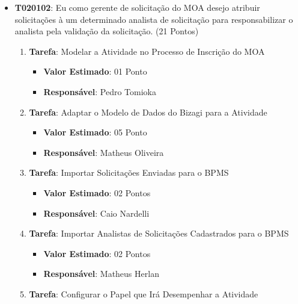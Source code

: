 \begin{itemize}
{\begin{itemize}
{\begin{enumerate}
{\begin{itemize}
					\end{itemize}}
				\item{\textbf{Tarefa}: Configurar o Papel que Irá Desempenhar a Atividade
					\begin{itemize}
						\item{\textbf{Valor Estimado}: 04 Pontos}
						\item{\textbf{Responsável}: Caio Nardelli}
					\end{itemize}}
			\end{enumerate}}
			\item{\textbf{T020102}: Eu como gerente de solicitação do MOA desejo atribuir solicitações à um determinado analista de solicitação para responsabilizar o analista pela validação da solicitação. (21 Pontos)
			\begin{enumerate}
				\item{\textbf{Tarefa}: Modelar a Atividade no Processo de Inscrição do MOA
					\begin{itemize}
						\item{\textbf{Valor Estimado}: 01 Ponto}
						\item{\textbf{Responsável}: Pedro Tomioka}
					\end{itemize}}
				\item{\textbf{Tarefa}: Adaptar o Modelo de Dados do Bizagi para a Atividade
					\begin{itemize}
						\item{\textbf{Valor Estimado}: 05 Ponto}
						\item{\textbf{Responsável}: Matheus Oliveira}
					\end{itemize}}
				\item{\textbf{Tarefa}: Importar Solicitações Enviadas para o BPMS
					\begin{itemize}
						\item{\textbf{Valor Estimado}: 02 Pontos}
						\item{\textbf{Responsável}: Caio Nardelli}
					\end{itemize}}
				\item{\textbf{Tarefa}: Importar Analistas de Solicitações Cadastrados para o BPMS
					\begin{itemize}
						\item{\textbf{Valor Estimado}: 02 Pontos}
						\item{\textbf{Responsável}: Matheus Herlan}
					\end{itemize}}
				\item{\textbf{Tarefa}: Configurar o Papel que Irá Desempenhar a Atividade
}
\end{enumerate}}
\end{itemize}}
\end{itemize}

